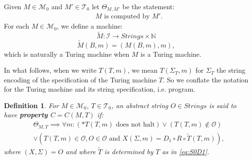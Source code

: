 \documentclass{amsart}  %
\numberwithin{equation}{section}
\newtheorem{definition}[equation]{Definition}
\theoremstyle{definition}
\theoremstyle{remark}
\begin{document}
{%
Given $M \in \mathcal{M} _{0} $ and $M' \in \mathcal{T} _{0} $ let $\Theta _{M,M'} $ be the statement:
\begin{equation}
\begin{split} \label{eq:assertion1}
   &  \text {$M$ is computed by $M'$}.
\end{split}   
 \end{equation}
For each $M \in \mathcal{M} _{0}$, we define a machine: 
$$\widetilde{M}: \mathcal{I} \to Strings \times \mathbb{N}  $$ 
\begin{equation} \label{eq:S0D1}
\widetilde{M}   (B,m) = (M (B,m),m),
\end{equation}
which is naturally a Turing machine when $M$ is a Turing machine.

In what follows, when we write $T (T, m)$, we mean $T (\Sigma _{T},m )$ for $\Sigma _{T} $ the string encoding of the specification of the Turing machine $T$. So we conflate the notation for the Turing machine and its string specification, i.e. program.
\begin{definition} \label{def:propertyO} For $M \in \mathcal{M} _{0} $, $T \in \mathcal{T} _{0} $,  an abstract string $O \in Strings$  is said to have \textbf{\emph{property $C=C (M,T)$}} if: \begin{align*} & \Theta _{M,T} \implies \forall m: (*T(T,m) \text{ does not halt} )  \lor (T (T,m) \notin \mathcal{O}) \\  & \lor ( T (T,m) \in \mathcal{O},O \in \mathcal{O} \text{ and } X(\Sigma,m) = D_1 \circ R \circ  \widetilde{T} (T, m)),
\end{align*}
where $(X, \Sigma)=O$
and where $\widetilde{T}$ is determined by $T$ as in \eqref{eq:S0D1}. 
\end {definition} 

}
\end{document}
